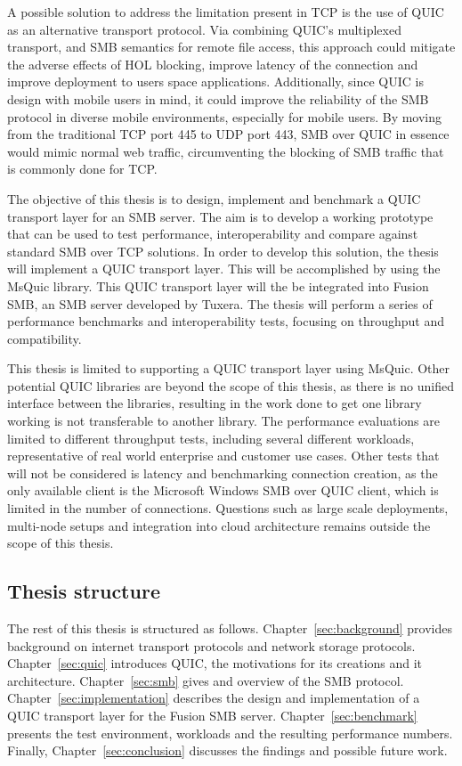 \documentclass[english, 12pt, a4paper, elec, utf8, a-2b, online]{aaltothesis}
\begin{document}
A possible solution to address the limitation present in TCP is the use of
QUIC as an alternative transport protocol. Via combining QUIC's multiplexed transport,
and SMB semantics for remote file access, this approach could mitigate the adverse effects of
HOL blocking, improve latency of the connection and improve deployment to users space
applications. Additionally, since QUIC is design with mobile users in mind, it could
improve the reliability of the SMB protocol in diverse mobile environments, especially
for mobile users. By moving from the traditional TCP port 445 to UDP port 443,
SMB over QUIC in essence would mimic normal web traffic, circumventing the blocking
of SMB traffic that is commonly done for TCP.

The objective of this thesis is to design, implement and benchmark a QUIC transport
layer for an SMB server. The aim is to develop a working prototype that can be used to
test performance, interoperability and compare against standard SMB over TCP solutions.
In order to develop this solution, the thesis will implement a QUIC transport layer. This
will be accomplished by using the MsQuic library\cite{msquic}. This QUIC transport layer
will the be integrated into Fusion SMB, an SMB server developed by Tuxera\cite{fusion}.
The thesis will perform a series of performance benchmarks and interoperability tests,
focusing on throughput and compatibility.

This thesis is limited to supporting a QUIC transport layer using MsQuic. Other
potential QUIC libraries are beyond the scope of this thesis, as there is no
unified interface between the libraries, resulting in the work done to get one
library working is not transferable to another library. The performance evaluations
are limited to different throughput tests, including several different workloads, representative of
real world enterprise and customer use cases.
Other tests that will not be considered is latency and benchmarking connection creation,
as the only available client is the Microsoft Windows SMB over QUIC client, which is
limited in the number of connections. Questions such as large scale deployments,
multi-node setups and integration into cloud architecture remains outside the scope
of this thesis.

\subsection{Thesis structure}

The rest of this thesis is structured as follows. Chapter~\ref{sec:background} provides
background on internet transport protocols and network storage protocols. Chapter~\ref{sec:quic} introduces
QUIC, the motivations for its creations and it architecture. Chapter~\ref{sec:smb} gives
and overview of the SMB protocol. Chapter~\ref{sec:implementation} describes the design
and implementation of a QUIC transport layer for the Fusion SMB server. Chapter~\ref{sec:benchmark}
presents the test environment, workloads and the resulting performance numbers. Finally, Chapter~\ref{sec:conclusion}
discusses the findings and possible future work.
\clearpage
\end{document}
